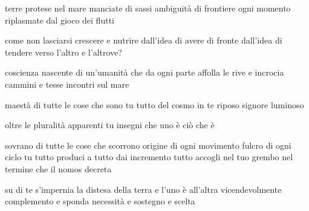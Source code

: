 \clearpage


\begin{poem}
	\begin{stanza}
		terre\verseline
		protese nel mare\verseline
		manciate di sassi\verseline
		ambiguità di frontiere\verseline
		ogni momento riplasmate\verseline
		dal gioco dei flutti
	\end{stanza}

	\begin{stanza}
		come non lasciarsi\verseline
		crescere e nutrire\verseline
		dall’idea di avere di fronte\verseline
		dall’idea di tendere\verseline
		verso l’altro e l’altrove?
	\end{stanza}

	\begin{stanza}
		coscienza nascente\verseline
		di un’umanità\verseline
		che da ogni parte affolla le rive\verseline
		e incrocia cammini\verseline
		e tesse incontri\verseline
		sul mare
	\end{stanza}
\end{poem}

\clearpage


\begin{poem}
	\begin{stanza}
		maestà di tutte le cose\verseline
		che sono\verseline
		tu tutto del cosmo\verseline
		in te riposo\verseline
		signore luminoso
	\end{stanza}

	\begin{stanza}
		oltre le pluralità apparenti\verseline
		tu insegni che uno è ciò che è
	\end{stanza}

	\begin{stanza}
		sovrano di tutte le cose\verseline
		che scorrono\verseline
		origine di ogni movimento\verseline
		fulcro di ogni ciclo\verseline
		tu tutto produci\verseline
		a tutto dai incremento\verseline
		tutto accogli nel tuo grembo\verseline
		nel termine che il nomos decreta
	\end{stanza}

	\begin{stanza}
		su di te s’impernia la distesa\verseline
		della terra\verseline
		e l’uno è all’altra\verseline
		vicendevolmente\verseline
		complemento e sponda\verseline
		necessità e sostegno\verseline
		e scelta
	\end{stanza}
\end{poem}

